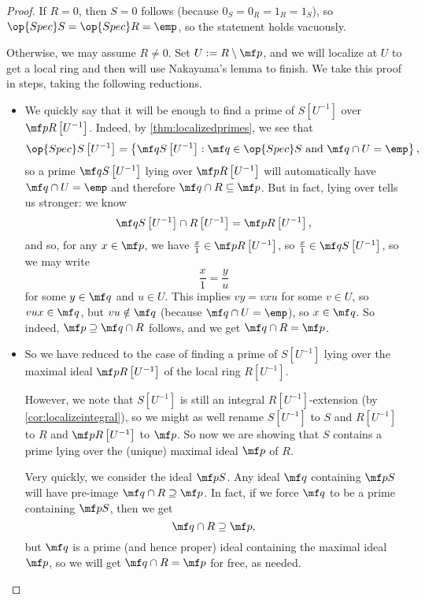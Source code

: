 \begin{proof}
	If $R=0$, then $S=0$ follows (because $0_S=0_R=1_R=1_S$), so $\op{Spec}S=\op{Spec}R=\emp$, so the statement holds vacuously.
	
	Otherwise, we may assume $R\ne0$. Set $U:=R\setminus\mf p$, and we will localize at $U$ to get a local ring and then will use Nakayama's lemma to finish. We take this proof in steps, taking the following reductions.
	\begin{itemize}
		\item We quickly say that it will be enough to find a prime of $S\left[U^{-1}\right]$ over $\mf pR\left[U^{-1}\right]$. Indeed, by \autoref{thm:localizedprimes}, we see that
		\[\op{Spec}S\left[U^{-1}\right]=\left\{\mf qS\left[U^{-1}\right]:\mf q\in\op{Spec}S\text{ and }\mf q\cap U=\emp\right\},\]
		so a prime $\mf qS\left[U^{-1}\right]$ lying over $\mf pR\left[U^{-1}\right]$ will automatically have $\mf q\cap U=\emp$ and therefore $\mf q\cap R\subseteq\mf p$. But in fact, lying over tells us stronger: we know
		\[\mf qS\left[U^{-1}\right]\cap R\left[U^{-1}\right]=\mf pR\left[U^{-1}\right],\]
		and so, for any $x\in\mf p$, we have $\frac x1\in\mf pR\left[U^{-1}\right]$, so $\frac{x}1\in\mf qS\left[U^{-1}\right]$, so we may write
		\[\frac{x}1=\frac y{u}\]
		for some $y\in\mf q$ and $u\in U$. This implies $vy=vxu$ for some $v\in U$, so $vux\in\mf q$, but $vu\notin\mf q$ (because $\mf q\cap U=\emp$), so $x\in\mf q$. So indeed, $\mf p\supseteq\mf q\cap R$ follows, and we get $\mf q\cap R=\mf p$.
	
		\item So we have reduced to the case of finding a prime of $S\left[U^{-1}\right]$ lying over the maximal ideal $\mf pR\left[U^{-1}\right]$ of the local ring $R\left[U^{-1}\right]$.
		
		However, we note that $S\left[U^{-1}\right]$ is still an integral $R\left[U^{-1}\right]$-extension (by \autoref{cor:localizeintegral}), so we might as well rename $S\left[U^{-1}\right]$ to $S$ and $R\left[U^{-1}\right]$ to $R$ and $\mf pR\left[U^{-1}\right]$ to $\mf p$. So now we are showing that $S$ contains a prime lying over the (unique) maximal ideal $\mf p$ of $R$.
		
		Very quickly, we consider the ideal $\mf pS$. Any ideal $\mf q$ containing $\mf pS$ will have pre-image $\mf q\cap R\supseteq\mf p$. In fact, if we force $\mf q$ to be a prime containing $\mf pS$, then we get
		\[\mf q\cap R\supseteq\mf p,\]
		but $\mf q$ is a prime (and hence proper) ideal containing the maximal ideal $\mf p$, so we will get $\mf q\cap R=\mf p$ for free, as needed.
		

\end{itemize}
\end{proof}
